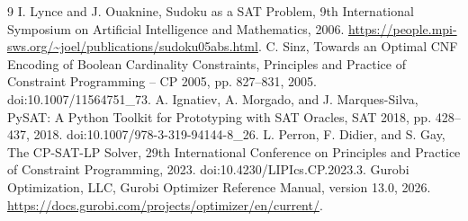 \documentclass[a4paper,fleqn]{cas-sc}
\begin{document}
\begin{thebibliography}{9}
 I. Lynce and J. Ouaknine, Sudoku as a SAT Problem, 9th International Symposium on Artificial Intelligence and Mathematics, 2006. \url{https://people.mpi-sws.org/~joel/publications/sudoku05abs.html}.
 C. Sinz, Towards an Optimal CNF Encoding of Boolean Cardinality Constraints, Principles and Practice of Constraint Programming -- CP 2005, pp. 827--831, 2005. doi:10.1007/11564751\_73.
 A. Ignatiev, A. Morgado, and J. Marques-Silva, PySAT: A Python Toolkit for Prototyping with SAT Oracles, SAT 2018, pp. 428--437, 2018. doi:10.1007/978-3-319-94144-8\_26.
 L. Perron, F. Didier, and S. Gay, The CP-SAT-LP Solver, 29th International Conference on Principles and Practice of Constraint Programming, 2023. doi:10.4230/LIPIcs.CP.2023.3.
 Gurobi Optimization, LLC, Gurobi Optimizer Reference Manual, version 13.0, 2026. \url{https://docs.gurobi.com/projects/optimizer/en/current/}.
\end{thebibliography}
\end{document}
